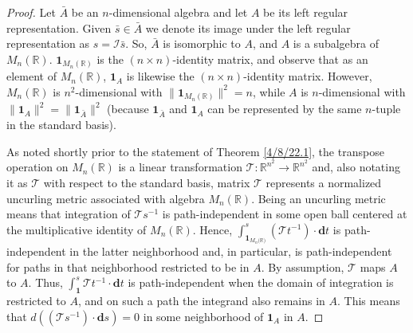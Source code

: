 \documentclass{amsart}
\numberwithin{equation}{section}
\theoremstyle{definition}
\numberwithin{theorem}{section}
\begin{document}
\begin{proof} 
Let $\bar{A}$ be an $n$-dimensional algebra and let $A$ be its left regular representation.  Given $\bar{s}\in\bar{A}$ we denote its image under the left regular representation as $s = \mathcal{I}\bar{s}$.
 So, $\bar{A}$ is isomorphic to $A$, and $A$ is a subalgebra of $ M_n(\mathbb{R})$.   $\mathbf{1}_{M_n(\mathbb{R})}$ is the $(n\times n)$-identity matrix, and observe that as an element of $ M_n(\mathbb{R})$, $\mathbf{1}_A$ is likewise the $(n\times n)$-identity matrix.  However, $ M_n(\mathbb{R})$ is $n^2$-dimensional with $\|\mathbf{1}_{M_n(\mathbb{R})}\|^2 = n$, while $A$ is $n$-dimensional with $\|\mathbf{1}_A\|^2 = \|\mathbf{1}_{\bar{A}}\|^2$ (because $\mathbf{1}_{\bar{A}}$ and  $\mathbf{1}_A$ can be represented by the same $n$-tuple in the standard basis).   

As noted shortly prior to the statement of Theorem \ref{4/8/22.1}, the transpose operation on $ M_n(\mathbb{R})$ is a linear transformation $\mathcal{\mathcal{T}}:\mathbb{R}^{n^2}\rightarrow \mathbb{R}^{n^2}$ and, also notating it as $\mathcal{\mathcal{T}}$ with respect to the standard basis, matrix $\mathcal{\mathcal{T}}$ represents a normalized uncurling metric associated with algebra  $ M_n(\mathbb{R})$.  Being an uncurling metric means that integration of $\mathcal{\mathcal{T}}s^{-1}$ is path-independent in some open ball centered at the multiplicative identity of $ M_n(\mathbb{R})$.  
 Hence, $\int_{\mathbf{1}_{M_n({\mathbb{R})}}}^s (\mathcal{\mathcal{T}}t^{-1})\cdot \mathbf{d}t$ is path-independent in the latter neighborhood and, in particular, is path-independent for paths in that neighborhood restricted to be in $A$.  By assumption, $\mathcal{\mathcal{T}}$ maps $A$ to $A$. 
 Thus, $\int_\mathbf{1}^s \mathcal{\mathcal{T}}t^{-1}\cdot \mathbf{d}t$ is path-independent when the domain of integration is restricted to $A$, and on such a path the integrand also remains in $A$.  This means that 
  $d((\mathcal{\mathcal{T}}s^{-1})\cdot \mathbf{d}s) = 0$ in some neighborhood of $\mathbf{1}_A$ in $A$.
  

\end{proof}
\end{document}
